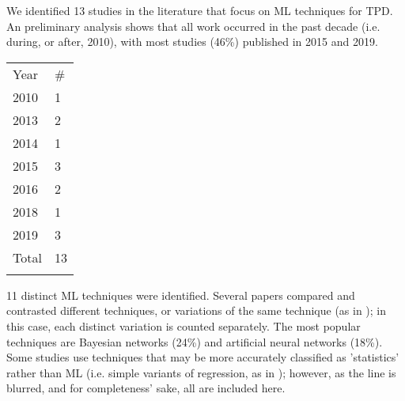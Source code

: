 \documentclass{article}
\begin{document}
We identified 13 studies in the literature that focus on ML techniques for TPD. An preliminary analysis shows that all work occurred in the past decade (i.e. during, or after, 2010), with most studies (46\%) published
in 2015 and 2019.

\begin{table}[h]
\centering
\begin{tabular}{ll}
\noalign{\smallskip}\hline \noalign{\smallskip}
Year  & \# \\	\noalign{\smallskip}\hline \noalign{\smallskip}
2010  & 1  \\
2013  & 2  \\
2014  & 1  \\
2015  & 3  \\
2016  & 2  \\
2018  & 1  \\
2019  & 3  \\ 	\noalign{\smallskip}
Total & 13 \\  \noalign{\smallskip}\hline
\end{tabular}
\end{table}

11 distinct ML techniques were identified. Several papers compared and contrasted different techniques, or variations of the same technique (as in \cite{lessan_fu_wen_2019}\cite{oneto_fumeo_clerico_canepa_papa_dambra_mazzino_anguita_2016}\cite{milinkovic_markovic_veskovic_ivic_pavlovic_2013}\cite{markovic_milinkovic_tikhonov_schonfeld_2015}); in this case, each distinct variation is counted separately. The most popular techniques are Bayesian networks (24\%) and artificial neural networks (18\%). Some studies use techniques that may be more accurately classified as 'statistics' rather than ML (i.e. simple variants of regression, as in \cite{pongnumkul_pechprasarn_kunaseth_chaipah_2014}\cite{wang_work_2015}); however, as the line is blurred, and for completeness' sake, all are included here.
\end{document}
